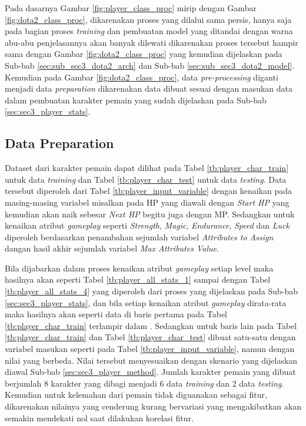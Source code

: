 Pada dasarnya Gambar \ref{fig:player_class_proc} mirip dengan Gambar \ref{fig:dota2_class_proc}, dikarenakan proses yang dilalui sama persis, hanya saja pada bagian proses \textit{training} dan pembuatan model yang ditandai dengan warna abu-abu penjelasannya akan banyak dilewati dikarenakan proses tersebut hampir sama dengan Gambar \ref{fig:dota2_class_proc} yang kemudian dijelaskan pada Sub-bab \ref{sec:sub_sec3_dota2_arch} dan Sub-bab \ref{sec:sub_sec3_dota2_model}. Kemudian pada Gambar \ref{fig:dota2_class_proc}, data \textit{pre-processing} diganti menjadi data \textit{preparation} dikarenakan data dibuat sesuai dengan masukan data dalam pembuatan karakter pemain yang sudah dijelaskan pada Sub-bab \ref{sec:sec3_player_stats}.
\vspace{1ex}

\subsection{Data Preparation}
\label{sec:sub_sec3_player_data_prep}
\vspace{1ex}

Dataset dari karakter pemain dapat dilihat pada Tabel \ref{tb:player_char_train} untuk data \textit{training} dan Tabel \ref{tb:player_char_test} untuk data \textit{testing}. Data tersebut diperoleh dari Tabel \ref{tb:player_input_variable} dengan kenaikan pada masing-masing variabel misalkan pada HP yang diawali dengan \textit{Start HP} yang kemudian akan naik sebesar \textit{Next HP} begitu juga dengan MP. Sedangkan untuk kenaikan atribut \textit{gameplay} seperti \textit{Strength}, \textit{Magic}, \textit{Endurance}, \textit{Speed} dan \textit{Luck} diperoleh berdasarkan penambahan sejumlah variabel \textit{Attributes to Assign} dangan hasil akhir sejumlah variabel \textit{Max Attributes Value}. 
\vspace{1ex}

Bila dijabarkan dalam proses kenaikan atribut \textit{gameplay} setiap level maka hasilnya akan seperti Tabel \ref{tb:player_all_stats_1} sampai dengan Tabel \ref{tb:player_all_stats_4} yang diperoleh dari proses yang dijelaskan pada Sub-bab \ref{sec:sec3_player_stats}, dan bila setiap kenaikan atribut \textit{gameplay} dirata-rata maka hasilnya akan seperti data di baris pertama pada Tabel \ref{tb:player_char_train} terlampir dalam . Sedangkan untuk baris lain pada Tabel \ref{tb:player_char_train} dan Tabel \ref{tb:player_char_test} dibuat satu-satu dengan variabel masukan seperti pada Tabel \ref{tb:player_input_variable}, namun dengan nilai yang berbeda. Nilai tersebut menyesuaikan dengan skenario yang dijelaskan diawal Sub-bab \ref{sec:sec3_player_method}. Jumlah karakter pemain yang dibuat berjumlah 8 karakter yang dibagi menjadi 6 data \textit{training} dan 2 data \textit{testing}.  Kemudian untuk kelemahan dari pemain tidak diguanakan sebagai fitur, dikarenakan nilainya yang cenderung kurang bervariasi yang mengakibatkan akan semakin mendekati nol saat dilakukan korelasi fitur.
\vspace{1ex}

